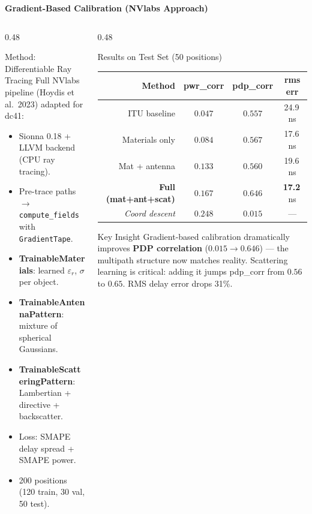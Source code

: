 \documentclass[
    aspectratio=169
]{beamer}
\begin{document}
\begin{frame}{\textbf{Gradient-Based Calibration (NVlabs Approach)}}
\vspace{-0.2cm}
\begin{columns}[T]
\begin{column}{0.48\textwidth}
\begin{block}{\footnotesize Method: Differentiable Ray Tracing}
\footnotesize
Full NVlabs pipeline (Hoydis et al.\ 2023) adapted for dc41:
\vspace{0.1cm}
\begin{itemize}
    \item Sionna 0.18 + LLVM backend (CPU ray tracing).
    \item Pre-trace paths $\to$ \texttt{compute\_fields} with \texttt{GradientTape}.
    \item \textbf{TrainableMaterials}: learned $\varepsilon_r$, $\sigma$ per object.
    \item \textbf{TrainableAntennaPattern}: mixture of spherical Gaussians.
    \item \textbf{TrainableScatteringPattern}: Lambertian + directive + backscatter.
    \item Loss: SMAPE delay spread + SMAPE power.
    \item 200 positions (120 train, 30 val, 50 test).
\end{itemize}
\end{block}
\end{column}
\begin{column}{0.48\textwidth}
\begin{block}{\footnotesize Results on Test Set (50 positions)}
\scriptsize
\begin{tabular}{rccc}
\toprule
\textbf{Method} & \textbf{pwr\_corr} & \textbf{pdp\_corr} & \textbf{rms err} \\
\midrule
ITU baseline & $0.047$ & $0.557$ & 24.9\,ns \\
Materials only & $0.084$ & $0.567$ & 17.6\,ns \\
Mat + antenna & $0.133$ & $0.560$ & 19.6\,ns \\
\rowcolor{green!15} \textbf{Full (mat+ant+scat)} & $\mathbf{0.167}$ & $\mathbf{0.646}$ & \textbf{17.2}\,ns \\
\midrule
\textit{Coord descent} & $0.248$ & $0.015$ & --- \\
\bottomrule
\end{tabular}
\end{block}
\vspace{0.1cm}
\begin{block}{\footnotesize Key Insight}
\footnotesize
Gradient-based calibration dramatically improves \textbf{PDP correlation} ($0.015 \to 0.646$) --- the multipath structure now matches reality. Scattering learning is critical: adding it jumps pdp\_corr from $0.56$ to $0.65$. RMS delay error drops 31\%.
\end{block}
\end{column}
\end{columns}
\end{frame}
\end{document}
